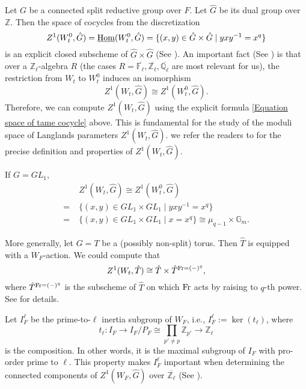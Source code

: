 	Let $G$ be a connected split reductive group over $F$. Let $\hat{G}$ be its dual group over $\mathbb{Z}$. Then the space of cocycles from the discretization
	\begin{equation}\label{Equation space of tame cocycle}
		Z^1(W_t^0, \hat{G})=\underline{\operatorname{\operatorname{Hom}}}(W_t^0, \hat{G})=\{(x, y) \in \hat{G} \times \hat{G}\;|\;yxy^{-1}=x^q\}
	\end{equation}
	is an explicit closed subscheme of $\hat{G} \times \hat{G}$ (See \cite[Section 3]{dat2022ihes}). An important fact (See \cite[Proposition 3.9]{dat2022ihes}) is that over a $\mathbb{Z}_{\ell}$-algebra $R$ (the cases $R=\overline{\mathbb{F}_{\ell}}, \overline{\mathbb{Z}_{\ell}}, \overline{\mathbb{Q}_{\ell}}$ are most relevant for us), the restriction from $W_t$ to $W_t^0$ induces an isomorphism
	$$Z^1(W_t, \hat{G}) \cong Z^1(W_t^0, \hat{G}).$$ 
	Therefore, we can compute $Z^1(W_t, \hat{G})$ using the explicit formula \ref{Equation space of tame cocycle} above. This is fundamental for the study of the moduli space of Langlands parameters $Z^1(W_t, \hat{G})$. we refer the readers to \cite[Section 3, 4]{dat2022ihes} for the precise definition and properties of $Z^1(W_t, \hat{G})$. 
	
	\begin{eg}\label{Example GL_1}
		If $G=GL_1$,
	  \begin{equation}
	  \begin{aligned}
		&Z^1(W_t, \hat{G}) \cong Z^1(W_t^0, \hat{G})\\
		=\;&\{(x, y) \in GL_1 \times GL_1\;|\;yxy^{-1}=x^q\}\\
		=\;&\{(x, y) \in GL_1 \times GL_1\;|\;x=x^q\} \cong \mu_{q-1} \times \mathbb{G}_m.
	  \end{aligned}
      \end{equation}
      
      More generally, let $G=T$ be a (possibly non-split) torus. Then $\hat{T}$ is equipped with a $W_F$-action. We could compute that
      \begin{equation}\label{Equation: Z^1(W, T)}
      Z^1(W_t, \hat{T}) \cong \hat{T} \times \hat{T}^{\operatorname{Fr}=(-)^q},
      \end{equation} 
      where $\hat{T}^{\operatorname{Fr}=(-)^q}$ is the subscheme of $\hat{T}$ on which $\operatorname{Fr}$ acts by raising to $q$-th power. See \cite[Example 3.14]{dat2022ihes} for details.
	\end{eg}
	
	Let $I_F^{\ell}$ be the prime-to-$\ell$ inertia subgroup of $W_F$, i.e., $I_F^{\ell}:=\ker(t_{\ell})$, where 
	$$t_\ell: I_F \to I_F/P_F \cong \prod_{p' \neq p}\mathbb{Z}_{p'} \to \mathbb{Z}_\ell$$
	is the composition. In other words, it is the maximal subgroup of $I_F$ with pro-order prime to $\ell$. This property makes $I_F^{\ell}$ important when determining the connected components of $Z^1(W_F, \hat{G})$ over $\overline{\mathbb{Z}_{\ell}}$ (See \cite[Theorem 4.2 and Subsection 4.6]{dat2022ihes}). 
	
